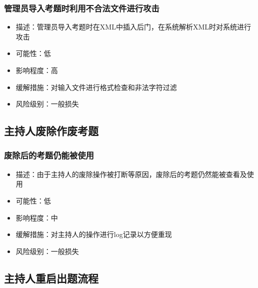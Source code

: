 \documentclass[hyperref, a4paper]{ctexart}
\providecommand{\tightlist}{%
  \setlength{\itemsep}{0pt}\setlength{\parskip}{0pt}}
\begin{document}
\hypertarget{ux7ba1ux7406ux5458ux5bfcux5165ux8003ux9898ux65f6ux5229ux7528ux4e0dux5408ux6cd5ux6587ux4ef6ux8fdbux884cux653bux51fb}{%
\subsubsection{管理员导入考题时利用不合法文件进行攻击}\label{ux7ba1ux7406ux5458ux5bfcux5165ux8003ux9898ux65f6ux5229ux7528ux4e0dux5408ux6cd5ux6587ux4ef6ux8fdbux884cux653bux51fb}}

\begin{itemize}
\tightlist
\item
  描述：管理员导入考题时在XML中插入后门，在系统解析XML时对系统进行攻击
\item
  可能性：低
\item
  影响程度：高
\item
  缓解措施：对输入文件进行格式检查和非法字符过滤
\item
  风险级别：一般损失
\end{itemize}

\hypertarget{ux4e3bux6301ux4ebaux5e9fux9664ux4f5cux5e9fux8003ux9898-1}{%
\subsection{主持人废除作废考题}\label{ux4e3bux6301ux4ebaux5e9fux9664ux4f5cux5e9fux8003ux9898-1}}

\hypertarget{ux5e9fux9664ux540eux7684ux8003ux9898ux4ecdux80fdux88abux4f7fux7528}{%
\subsubsection{废除后的考题仍能被使用}\label{ux5e9fux9664ux540eux7684ux8003ux9898ux4ecdux80fdux88abux4f7fux7528}}

\begin{itemize}
\tightlist
\item
  描述：由于主持人的废除操作被打断等原因，废除后的考题仍然能被查看及使用
\item
  可能性：低
\item
  影响程度：中
\item
  缓解措施：对主持人的操作进行log记录以方便重现
\item
  风险级别：一般损失
\end{itemize}

\hypertarget{ux4e3bux6301ux4ebaux91cdux542fux51faux9898ux6d41ux7a0b-1}{%
\subsection{主持人重启出题流程}\label{ux4e3bux6301ux4ebaux91cdux542fux51faux9898ux6d41ux7a0b-1}}
\end{document}
